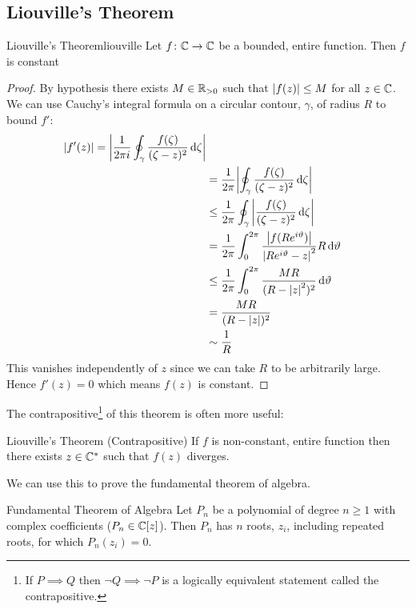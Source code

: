 \documentclass{article}
\begin{document}
    \subsection{Liouville's Theorem}
    \begin{theorem}{Liouville's Theorem}{liouville}
        Let \(f\colon\mathbb{C}\to\mathbb{C}\) be a bounded, entire function.
        Then \(f\) is constant
    \end{theorem}
    \begin{proof}
        By hypothesis there exists \(M\in\mathbb{R}_{>0}\) such that \(\abs{f(z)} \le M\) for all \(z\in\mathbb{C}\).
        We can use Cauchy's integral formula on a circular contour, \(\gamma\), of radius \(R\) to bound \(f'\):
        \begin{align*}
            \abs{f'(z)} = \abs{\frac{1}{2\pi i} \oint_{\gamma} \frac{f(\zeta)}{(\zeta - z)^2} \dd{\zeta}}\\
            &= \frac{1}{2\pi} \abs{\oint_\gamma \frac{f(\zeta)}{(\zeta - z)^2} \dd{\zeta}}\\
            &\le \frac{1}{2\pi} \oint_\gamma \abs{\frac{f(\zeta)}{(\zeta - z)^2}\dd{\zeta}}\\
            &= \frac{1}{2\pi} \int_0^{2\pi} \frac{\abs{f(Re^{i\vartheta})}}{\abs{Re^{i\vartheta} - z}^2} R\dd{\vartheta}\\
            &\le \frac{1}{2\pi} \int_0^{2\pi} \frac{MR}{(R - \abs{z}^2)^2}\dd{\vartheta}\\
            &= \frac{MR}{(R - \abs{z})^2}\\
            &\sim \frac{1}{R}
        \end{align*}
        This vanishes independently of \(z\) since we can take \(R\) to be arbitrarily large.
        Hence \(f'(z) = 0\) which means \(f(z)\) is constant.
    \end{proof}
    The contrapositive\footnote{If \(P\implies Q\) then \(\neg Q\implies \neg P\) is a logically equivalent statement called the contrapositive.} of this theorem is often more useful:
    \addtocounter{theoremCounter}{-1}
    \begin{theorem}{Liouville's Theorem (Contrapositive)}{}
        If \(f\) is non-constant, entire function then there exists \(z\in\mathbb{C}^*\) such that \(f(z)\) diverges.
    \end{theorem}
    We can use this to prove the fundamental theorem of algebra.
    \begin{theorem}{Fundamental Theorem of Algebra}{}
        Let \(P_n\) be a polynomial of degree \(n \ge 1\) with complex coefficients (\(P_n\in\mathbb{C}[z]\)).
        Then \(P_n\) has \(n\) roots, \(z_i\), including repeated roots, for which \(P_n(z_i) = 0\).
    \end{theorem}
\end{document}
